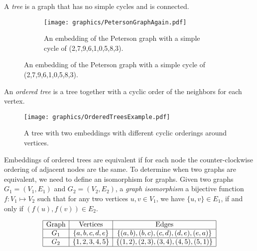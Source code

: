 A \textit{tree} is a graph that has no simple cycles and is connected.
\begin{figure}[h]
\begin{center}
  \begin{subfigure}[b]{0.49\textwidth}
    \texttt{[image: graphics/PetersonGraphAgain.pdf]}
    \caption{An embedding of the Peterson graph with a simple cycle of 
    (2,7,9,6,1,0,5,8,3).}\label{fig:ch1-graph-2}
  \end{subfigure}
  
\end{center}
\end{figure}
An \textit{ordered tree} is a tree together with a cyclic order of the neighbors for each vertex.
\begin{figure}[h]
\begin{center}
    \texttt{[image: graphics/OrderedTreesExample.pdf]}
    \caption{A tree with two embeddings with different cyclic orderings around 
vertices.}\label{fig:ch1-graph-6}
\end{center}
\end{figure}
Embeddings of ordered trees are equivalent if for each node the counter-clockwise ordering of 
adjacent nodes are the same.
To determine when two graphs are equivalent, we need to define an isomorphism for graphs.  Given 
two graphs $G_1 =(V_1,E_1)$ and $G_2 = (V_2,E_2) $, a \textit{graph isomorphism} a bijective 
function $f: V_1 \mapsto 
V_2$ 
such that for any two vertices $u,v \in V_1$, we have $\{u, v\} \in E_1$, if and 
only 
if $(f(u),f(v)) \in E_2$. 
\begin{table}[!ht]
\begin{center}
$$\begin{array}{|c|c|c|}\hline
\text{Graph}&\text{Vertices}&\text{Edges}\\\hline
G_1&\left\lbrace a,b,c,d,e \right\rbrace & \left\lbrace (a,b),(b,c),(c,d),(d,e),(e,a) \right\rbrace 
\\\hline
G_2&\left\lbrace 1,2,3,4,5 \right\rbrace & \left\lbrace (1,2),(2,3),(3,4),(4,5),(5,1) \right\rbrace 
\\\hline
\end{array} $$
\caption{Two graphs that are isomorphic with the alphabetical isomorphism $f(a)=1$, $f(b)=2$, $f(c) 
= 3$, $f(d)=4$, $f(e)=5$.}
\end{center} 
\label{table:ch1-graph-1}
\end{table}

